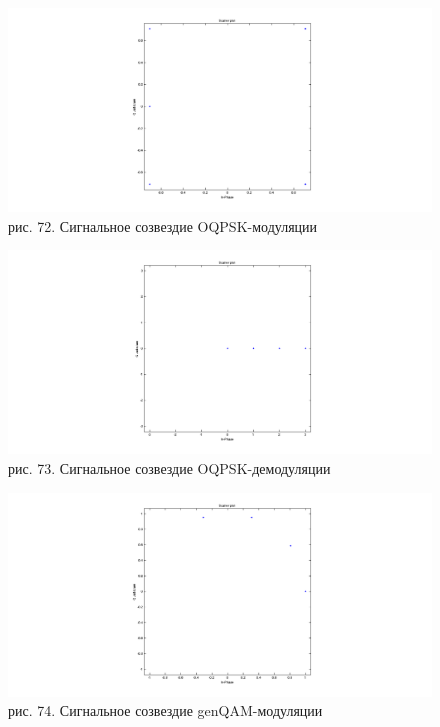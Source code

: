 \documentclass[10pt,a4paper]{report}
\begin{document}
\begin{figure}
\begin{center}
\includegraphics[width=150mm, scale = 0.9]{91_5}\newline
рис. 72. Сигнальное созвездие OQPSK-модуляции\newline
\end{center}
\end{figure}
\begin{figure}
\begin{center}
\includegraphics[width=150mm, scale = 0.9]{91_6}\newline
рис. 73. Сигнальное созвездие OQPSK-демодуляции\newline
\end{center}
\end{figure}
\begin{figure}
\begin{center}
\includegraphics[width=150mm, scale = 0.9]{91_7}\newline
рис. 74. Сигнальное созвездие genQAM-модуляции\newline
\end{center}
\end{figure}
\end{document}
